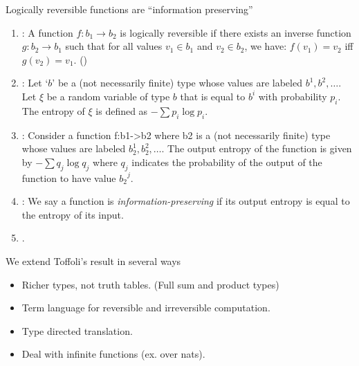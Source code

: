 \documentclass[svgnames,11pt]{beamer}
\newcommand{\red}[1]{{\color{red}{#1}}}
\begin{document}
\begin{frame}{Logically reversible functions are ``information
    preserving''}

\vfill

  \begin{enumerate}


  \item \red{Logical reversibility}: A function $f : b_1 \rightarrow b_2$ is
    logically reversible if there exists an inverse function $g : b_2
    \rightarrow b_1$ such that for all values $v_1 \in b_1$ and $v_2
    \in b_2$, we have: $f(v_1) = v_2$ iff $g(v_2) =
    v_1$. (\cite{Zuliani:2001:LR})

  \item \red{Entropy of a variable} : Let `$b$' be a (not necessarily
    finite) type whose values are labeled $b^1, b^2, \ldots$. Let
    $\xi$ be a random variable of type $b$ that is equal to $b^i$ with
    probability $p_i$. The entropy of $\xi$ is defined as $-\sum p_i
    \log{p_i}$.

  \item \red{Output entropy of a function}: Consider a function
    {{f:b1->b2}} where {{b2}} is a (not necessarily finite) type whose
    values are labeled $b_2^1, b_2^2, \ldots$. The output entropy of
    the function is given by $- \sum q_j \log{q_j}$ where $q_j$
    indicates the probability of the output of the function to have
    value ${b_2}^j$.


  \item \red{Information Preservation}: We say a function is
    \emph{information-preserving} if its output entropy is equal to
    the entropy of its input.

  \item \red{Non-termination is not an observable}.

  \end{enumerate}

\vfill
  
\end{frame}



\begin{frame} {We extend Toffoli's result in several ways}

  \begin{itemize}

 \vfill
  \item Richer types, not truth tables. (Full sum and product types)

    \vfill
  \item Term language for reversible and irreversible computation.

    \vfill
  \item Type directed translation.

    \vfill
  \item Deal with infinite functions (ex. over nats).
  \end{itemize}
\end{frame}
\end{document}
